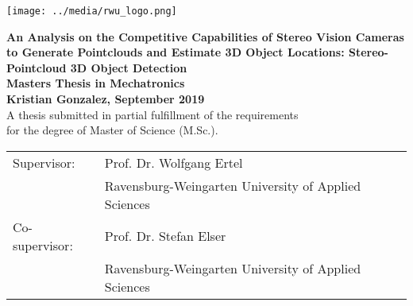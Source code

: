 \pagestyle{empty}
\begin{flushright}
\texttt{[image: ../media/rwu\_logo.png]}
\end{flushright}

\begin{center}
\vspace*{2cm}

\LARGE
\textbf{An Analysis on the Competitive Capabilities of Stereo Vision Cameras to Generate Pointclouds and Estimate 3D Object Locations: Stereo-Pointcloud 3D Object Detection}\\
\Large
\vspace*{2cm}
\noindent \textbf{Masters Thesis in Mechatronics}\\
\vspace*{0.5cm}
\noindent \textbf{Kristian Gonzalez, September 2019}\\
\vspace*{2cm}
\normalsize
A thesis submitted in partial fulfillment of the requirements\\ for the degree
of Master of Science (M.Sc.).

\end{center}

\vspace*{4.5cm}
\begin{tabular}{ll}
Supervisor: & Prof. Dr. Wolfgang Ertel \\
 & Ravensburg-Weingarten University of Applied Sciences\\
Co-supervisor: & Prof. Dr. Stefan Elser\\
 & Ravensburg-Weingarten University of Applied Sciences\\
\end{tabular}

